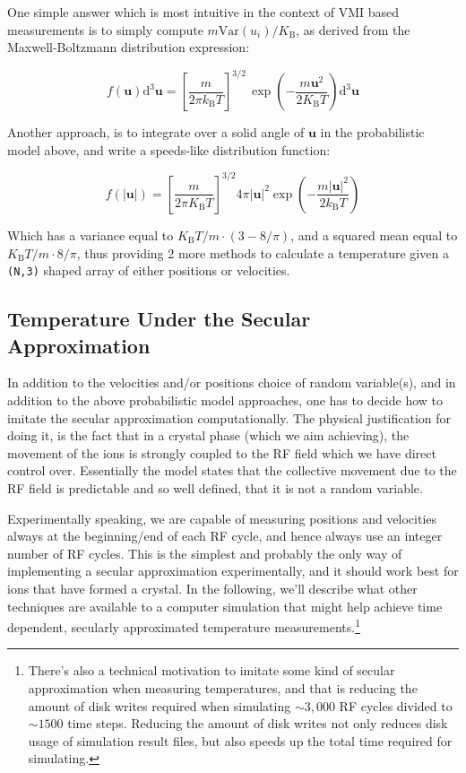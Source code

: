 One simple answer which is most intuitive in the context of VMI based measurements is to simply compute $m \mathrm{Var}(u_i)/K_\text{B}$, as derived from the Maxwell-Boltzmann distribution expression:

\begin{equation}
	f(\mathbf{u}) \mathrm{d}^{3}\mathbf{u} = \left[\frac{m}{2\pi k_{\text{B}}T}\right]^{3/2}\,\exp \left(-{\frac {m \mathbf{u}^2}{2K_\text{B} T}}\right) \mathrm{d}^{3}\mathbf{u}
\end{equation}

Another approach, is to integrate over a solid angle of $\mathbf{u}$ in the probabilistic model above, and write a speeds-like distribution function:

\begin{equation}
	f(|\mathbf{u}|) = \left[{\frac{m}{2\pi K_\text{B} T}}\right]^{3/2} 4\pi |\mathbf{u}|^{2}\exp\left(-{\frac{m |\mathbf{u}|^{2}}{2k_{\text{B}}T}}\right)
\end{equation}

Which has a variance equal to $K_\text{B} T/m \cdot (3 - 8/\pi)$, and a squared mean equal to $K_\text{B} T/m \cdot 8/\pi$, thus providing 2 more methods to calculate a temperature given a \texttt{(N,3)} shaped array of either positions or velocities.

\subsection{Temperature Under the Secular Approximation}\label{ssec:T_rf_type}

In addition to the velocities and/or positions choice of random variable(s), and in addition to the above probabilistic model approaches, one has to decide how to imitate the secular approximation computationally. The physical justification for doing it, is the fact that in a crystal phase (which we aim achieving), the movement of the ions is strongly coupled to the RF field which we have direct control over. Essentially the model states that the collective movement due to the RF field is predictable and so well defined, that it is not a random variable.

Experimentally speaking, we are capable of measuring positions and velocities always at the beginning/end of each RF cycle, and hence always use an integer number of RF cycles. This is the simplest and probably the only way of implementing a secular approximation experimentally, and it should work best for ions that have formed a crystal. In the following, we'll describe what other techniques are available to a computer simulation that might help achieve time dependent, secularly approximated temperature measurements.\footnote{There's also a technical motivation to imitate some kind of secular approximation when measuring temperatures, and that is reducing the amount of disk writes required when simulating $\sim 3,000$ RF cycles divided to $\sim 1500$ time steps. Reducing the amount of disk writes not only reduces disk usage of simulation result files, but also speeds up the total time required for simulating.}

